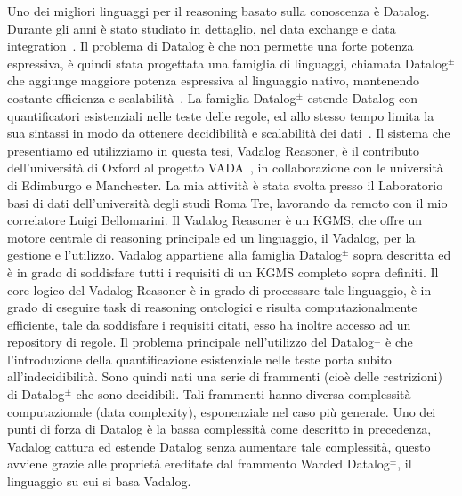 Uno dei migliori linguaggi per il reasoning basato sulla conoscenza è Datalog. Durante gli anni è stato studiato in dettaglio, nel data exchange e data integration~\cite{furche2016data}. \newline
Il problema di Datalog è che non permette una forte potenza espressiva, è quindi stata progettata una famiglia di linguaggi, chiamata Datalog$^\pm$ che aggiunge maggiore potenza espressiva al linguaggio nativo, mantenendo costante efficienza e scalabilità~\cite{bellomarini2017swift}. \newline 
La famiglia Datalog$^\pm$ estende Datalog con quantificatori esistenziali nelle teste delle regole, ed allo stesso tempo limita la sua sintassi in modo da ottenere decidibilità e scalabilità dei dati~\cite{cali2013taming,cali2012towards,cali2010datalog+}.  \newline \newline
Il sistema che presentiamo ed utilizziamo in questa tesi, Vadalog Reasoner, è il contributo dell'università di Oxford al progetto VADA~\cite{VADA}, in collaborazione con le università di Edimburgo e Manchester. La mia attività è stata svolta presso il Laboratorio basi di dati dell'università degli studi Roma Tre, lavorando da remoto con il mio correlatore Luigi Bellomarini. \newline
Il Vadalog Reasoner è un KGMS, che offre un motore centrale di reasoning principale ed un linguaggio, il Vadalog, per la gestione e l'utilizzo. \newline
Vadalog appartiene alla famiglia Datalog$^\pm$ sopra descritta ed è in grado di soddisfare tutti i requisiti di un KGMS completo sopra definiti. \newline
Il core logico del Vadalog Reasoner è in grado di processare tale linguaggio, è in grado di eseguire task di reasoning ontologici e risulta computazionalmente efficiente, tale da soddisfare i requisiti citati, esso ha inoltre accesso ad un repository di regole. \newline
Il problema principale nell'utilizzo del Datalog$^\pm$ è che l'introduzione della quantificazione esistenziale nelle teste porta subito all'indecidibilità. Sono quindi nati una serie di frammenti (cioè delle restrizioni) di Datalog$^\pm$ che sono decidibili. \newline
Tali frammenti hanno diversa complessità computazionale (data complexity), esponenziale nel caso più generale. \newline
Uno dei punti di forza di Datalog è la bassa complessità come descritto in precedenza, Vadalog cattura ed estende Datalog senza aumentare tale complessità, questo avviene grazie alle proprietà ereditate dal frammento Warded Datalog$^\pm$, il linguaggio su cui si basa Vadalog. \newline
